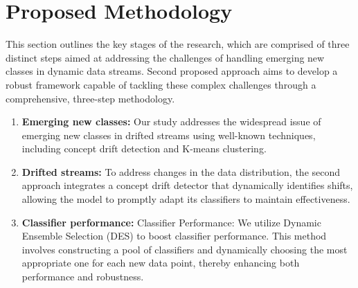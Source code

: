 
\section{Proposed Methodology}
\label{sec:proposed_methodology}
This section outlines the key stages of the research, which are comprised of three distinct steps aimed at addressing the challenges of handling emerging new classes in dynamic data streams. Second proposed approach aims to develop a robust framework capable of tackling these complex challenges through a comprehensive, three-step methodology.
\begin{enumerate}
	\item \textbf{Emerging new classes:} Our study addresses the widespread issue of emerging new classes in drifted streams using well-known techniques, including concept drift detection and K-means clustering.
	\item \textbf{Drifted streams:} To address changes in the data distribution, the second approach integrates a concept drift detector that dynamically identifies shifts, allowing the model to promptly adapt its classifiers to maintain effectiveness.
	\item \textbf{Classifier performance:} Classifier Performance: We utilize Dynamic Ensemble Selection (DES) to boost classifier performance. This method involves constructing a pool of classifiers and dynamically choosing the most appropriate one for each new data point, thereby enhancing both performance and robustness.
\end{enumerate}
